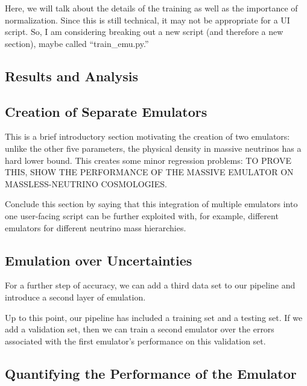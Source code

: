\documentclass[11pt]{article}
\begin{document}
Here, we will talk about the details of the training as well as the importance of normalization. Since this is still technical, it may not be appropriate for a UI script. So, I am considering breaking out a new script (and therefore a new section), maybe called ``train\_emu.py.''

\begin{centering}
\section{Results and Analysis}
\end{centering}

\begin{centering}
\subsection{Creation of Separate Emulators}
\end{centering}

This is a brief introductory section motivating the creation of two emulators: unlike the other five parameters, the physical density in massive neutrinos has a hard lower bound. This creates some minor regression problems: TO PROVE THIS, SHOW THE PERFORMANCE OF THE MASSIVE EMULATOR ON MASSLESS-NEUTRINO COSMOLOGIES.

Conclude this section by saying that this integration of multiple emulators into one user-facing script can be further exploited with, for example, different emulators for different neutrino mass hierarchies.

\begin{centering}
\subsection{Emulation over Uncertainties}
\end{centering}

For a further step of accuracy, we can add a third data set to our pipeline
and introduce a second layer of emulation.

Up to this point, our pipeline has included a training set and a testing set.
If we add a validation set, then we can train a second emulator over the
errors associated with the first emulator's performance on this validation
set.

\begin{centering}
\subsection{Quantifying the Performance of the Emulator}
\end{centering}
\end{document}
